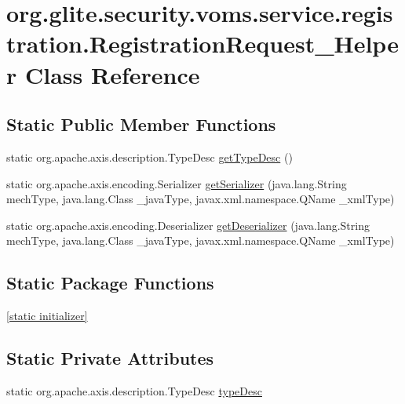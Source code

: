\hypertarget{classorg_1_1glite_1_1security_1_1voms_1_1service_1_1registration_1_1RegistrationRequest__Helper}{
\section{org.glite.security.voms.service.registration.RegistrationRequest\_\-Helper Class Reference}
\label{classorg_1_1glite_1_1security_1_1voms_1_1service_1_1registration_1_1RegistrationRequest__Helper}
}
\subsection*{Static Public Member Functions}
\begin{DoxyCompactItemize}
\item 
static org.apache.axis.description.TypeDesc \hyperlink{classorg_1_1glite_1_1security_1_1voms_1_1service_1_1registration_1_1RegistrationRequest__Helper_ab7284c794b26b758e4d0c59f6ed7ace5}{getTypeDesc} ()
\item 
static org.apache.axis.encoding.Serializer \hyperlink{classorg_1_1glite_1_1security_1_1voms_1_1service_1_1registration_1_1RegistrationRequest__Helper_a008b02fb753fba6c4996c4cb2bc867f4}{getSerializer} (java.lang.String mechType, java.lang.Class \_\-javaType, javax.xml.namespace.QName \_\-xmlType)
\item 
static org.apache.axis.encoding.Deserializer \hyperlink{classorg_1_1glite_1_1security_1_1voms_1_1service_1_1registration_1_1RegistrationRequest__Helper_a1357f84c048c292c03f64ad381bb3bc4}{getDeserializer} (java.lang.String mechType, java.lang.Class \_\-javaType, javax.xml.namespace.QName \_\-xmlType)
\end{DoxyCompactItemize}
\subsection*{Static Package Functions}
\begin{DoxyCompactItemize}
\item 
\hyperlink{classorg_1_1glite_1_1security_1_1voms_1_1service_1_1registration_1_1RegistrationRequest__Helper_a60277e0d0b758b5f352ddd5e15a52115}{\mbox{[}static initializer\mbox{]}}
\end{DoxyCompactItemize}
\subsection*{Static Private Attributes}
\begin{DoxyCompactItemize}
\item 
static org.apache.axis.description.TypeDesc \hyperlink{classorg_1_1glite_1_1security_1_1voms_1_1service_1_1registration_1_1RegistrationRequest__Helper_af760a1fa2f4c2af364fda1530f9429e3}{typeDesc}
\end{DoxyCompactItemize}


